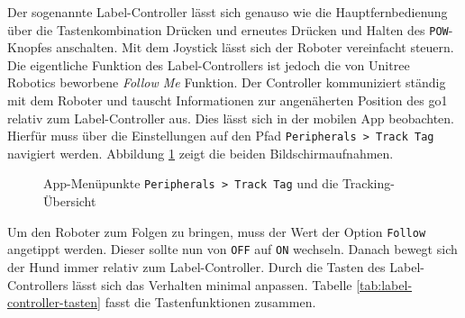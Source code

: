 Der sogenannte Label-Controller lässt sich genauso wie die Hauptfernbedienung über die Tastenkombination Drücken und
erneutes Drücken und Halten des \texttt{POW}-Knopfes anschalten.
Mit dem Joystick lässt sich der Roboter vereinfacht steuern.
Die eigentliche Funktion des Label-Controllers ist jedoch die von Unitree Robotics beworbene \emph{Follow Me} Funktion.
Der Controller kommuniziert ständig mit dem Roboter und tauscht Informationen zur angenäherten Position des \gls{go1} relativ
zum Label-Controller aus.
Dies lässt sich in der mobilen App beobachten.
Hierfür muss über die Einstellungen auf den Pfad \texttt{Peripherals > Track Tag} navigiert werden.
Abbildung \ref{fig:follow-me} zeigt die beiden Bildschirmaufnahmen.

\begin{figure}[h]
    \caption{App-Menüpunkte \texttt{Peripherals > Track Tag} und die Tracking-Übersicht}\label{fig:follow-me}
\end{figure}

Um den Roboter zum Folgen zu bringen, muss der Wert der Option \texttt{Follow} angetippt werden.
Dieser sollte nun von \texttt{OFF} auf \texttt{ON} wechseln.
Danach bewegt sich der Hund immer relativ zum Label-Controller.
Durch die Tasten des Label-Controllers lässt sich das Verhalten minimal anpassen.
Tabelle \ref{tab:label-controller-tasten} fasst die Tastenfunktionen zusammen.

